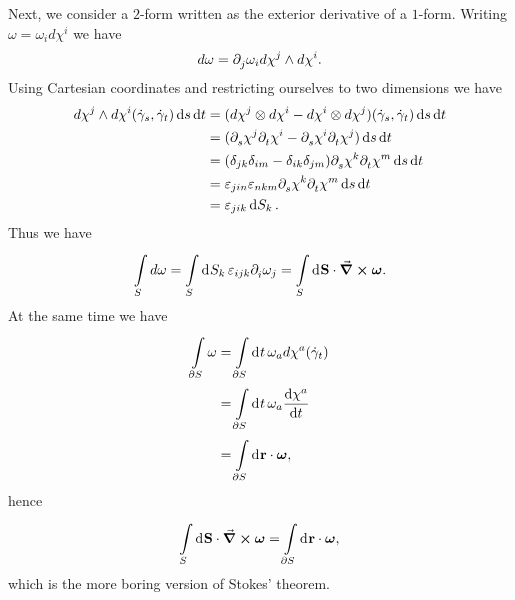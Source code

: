Next, we consider a $2$-form written as the exterior derivative of a $1$-form. Writing $\omega = \omega_{i}d\chi^{i}$ we have
\begin{align*}
	d\omega = \partial^{}_{j}\omega_{i}d\chi^{j}\wedge d\chi^{i}.
\end{align*}
Using Cartesian coordinates and restricting ourselves to two dimensions we have
\begin{align*}
	d\chi^{j}\wedge d\chi^{i}(\dot{\gamma}_{s}, \dot{\gamma}_{t})\dd{s}\dd{t} &= (d\chi^{j}\otimes d\chi^{i} - d\chi^{i}\otimes d\chi^{j})(\dot{\gamma}_{s}, \dot{\gamma}_{t})\dd{s}\dd{t} \\
	&= (\partial^{}_{s}\chi^{j}\partial^{}_{t}\chi^{i} - \partial^{}_{s}\chi^{i}\partial^{}_{t}\chi^{j})\dd{s}\dd{t} \\
	&= (\delta_{jk}\delta_{im} - \delta_{ik}\delta_{jm})\partial^{}_{s}\chi^{k}\partial^{}_{t}\chi^{m}\dd{s}\dd{t} \\
	&= \varepsilon_{jin}\varepsilon_{nkm}\partial^{}_{s}\chi^{k}\partial^{}_{t}\chi^{m}\dd{s}\dd{t} \\
	&= \varepsilon_{jik}\dd{S_{k}}.
\end{align*}
Thus we have
\begin{align*}
	\int\limits_{S}d\omega = \int\limits_{S}^{}\dd[]{S_{k}}\varepsilon_{ijk}\partial^{}_{i}\omega_{j} = \int\limits_{S}^{}\dd[]{\vb{S}}\cdot\curl{\vb*{\omega}}.
\end{align*}
At the same time we have
\begin{align*}
	\int\limits_{\partial S}\omega &= \int\limits_{\partial S}^{}\dd[]{t}\omega_{a}d\chi^{a}(\dot{\gamma}_{t}) \\
	                           &= \int\limits_{\partial S}^{}\dd[]{t}\omega_{a}\dv{\chi^{a}}{t} \\
	                           &= \int\limits_{\partial S}^{}\dd[]{\vb{r}}\cdot\vb*{\omega},
\end{align*}
hence
\begin{align*}
	\int\limits_{S}^{}\dd[]{\vb{S}}\cdot\curl{\vb*{\omega}} = \int\limits_{\partial S}^{}\dd[]{\vb{r}}\cdot\vb*{\omega},
\end{align*}
which is the more boring version of Stokes' theorem.

